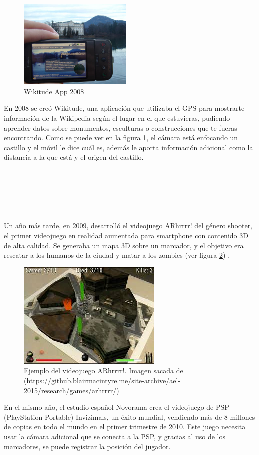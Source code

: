 \begin{figure}
    \centering
    \includegraphics[width=0.48\textwidth]{Images/Wikitude_Example.jpeg}
    \caption{Wikitude App 2008}
    \label{fig:wikitude2008}
\end{figure}
En 2008 se creó Wikitude, una aplicación que utilizaba el GPS para mostrarte información de la Wikipedia según el lugar en el que estuvieras, pudiendo aprender datos sobre monumentos, esculturas o construcciones que te fueras encontrando. Como se puede ver en la figura \ref{fig:wikitude2008}, el cámara está enfocando un castillo y el móvil le dice cuál es, además le aporta información adicional como la distancia a la que está y el origen del castillo. \\
\\
\\
\\
\\
\\
\\

Un año más tarde, en 2009, desarrolló el videojuego ARhrrrr! del género shooter, el primer videojuego en realidad aumentada para smartphone con contenido 3D de alta calidad. Se generaba un mapa 3D sobre un marcador, y el objetivo era rescatar a los humanos de la ciudad y matar a los zombies (ver figura \ref{fig:arhrrrr}) \cite{ARToolkit}.
\begin{figure}[H]
    \centering
        \includegraphics[width=0.5\linewidth]{Images/Arrrr.jpeg}
        \caption{Ejemplo del videojuego ARhrrrr!. Imagen sacada de (\url{https://github.blairmacintyre.me/site-archive/ael-2015/research/games/arhrrrr/})}
        \label{fig:arhrrrr}
  \end{figure}
En el mismo año, el estudio español Novorama crea el videojuego de PSP (PlayStation Portable) Invizimals, un éxito mundial, vendiendo más de 8 millones de copias en todo el mundo en el primer trimestre de 2010. Este juego necesita usar la cámara adicional que se conecta a la PSP, y gracias al uso de los marcadores, se puede registrar la posición del jugador.

